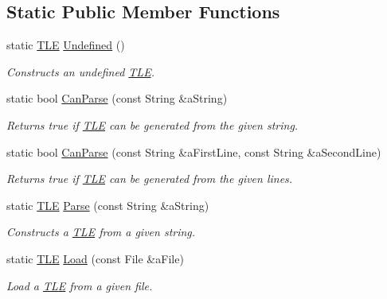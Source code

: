 \subsection*{Static Public Member Functions}
\begin{DoxyCompactItemize}
\item 
static \hyperlink{classostk_1_1astro_1_1trajectory_1_1orbit_1_1models_1_1sgp4_1_1_t_l_e}{T\+LE} \hyperlink{classostk_1_1astro_1_1trajectory_1_1orbit_1_1models_1_1sgp4_1_1_t_l_e_a871cdedd5bc51c9f3afa976e0597ea51}{Undefined} ()
\begin{DoxyCompactList}\small\item\em Constructs an undefined \hyperlink{classostk_1_1astro_1_1trajectory_1_1orbit_1_1models_1_1sgp4_1_1_t_l_e}{T\+LE}. \end{DoxyCompactList}\item 
static bool \hyperlink{classostk_1_1astro_1_1trajectory_1_1orbit_1_1models_1_1sgp4_1_1_t_l_e_a843f3432e8411de6b8d7e9c40d7191d2}{Can\+Parse} (const String \&a\+String)
\begin{DoxyCompactList}\small\item\em Returns true if \hyperlink{classostk_1_1astro_1_1trajectory_1_1orbit_1_1models_1_1sgp4_1_1_t_l_e}{T\+LE} can be generated from the given string. \end{DoxyCompactList}\item 
static bool \hyperlink{classostk_1_1astro_1_1trajectory_1_1orbit_1_1models_1_1sgp4_1_1_t_l_e_a1e808cef2bd2466a8d7813f2c5d5bfc4}{Can\+Parse} (const String \&a\+First\+Line, const String \&a\+Second\+Line)
\begin{DoxyCompactList}\small\item\em Returns true if \hyperlink{classostk_1_1astro_1_1trajectory_1_1orbit_1_1models_1_1sgp4_1_1_t_l_e}{T\+LE} can be generated from the given lines. \end{DoxyCompactList}\item 
static \hyperlink{classostk_1_1astro_1_1trajectory_1_1orbit_1_1models_1_1sgp4_1_1_t_l_e}{T\+LE} \hyperlink{classostk_1_1astro_1_1trajectory_1_1orbit_1_1models_1_1sgp4_1_1_t_l_e_a7f97a74af47895aa315aebc52f410d26}{Parse} (const String \&a\+String)
\begin{DoxyCompactList}\small\item\em Constructs a \hyperlink{classostk_1_1astro_1_1trajectory_1_1orbit_1_1models_1_1sgp4_1_1_t_l_e}{T\+LE} from a given string. \end{DoxyCompactList}\item 
static \hyperlink{classostk_1_1astro_1_1trajectory_1_1orbit_1_1models_1_1sgp4_1_1_t_l_e}{T\+LE} \hyperlink{classostk_1_1astro_1_1trajectory_1_1orbit_1_1models_1_1sgp4_1_1_t_l_e_a5e912145266460d05beaba326b5ace95}{Load} (const File \&a\+File)
\begin{DoxyCompactList}\small\item\em Load a \hyperlink{classostk_1_1astro_1_1trajectory_1_1orbit_1_1models_1_1sgp4_1_1_t_l_e}{T\+LE} from a given file. \end{DoxyCompactList}\end{DoxyCompactItemize}
